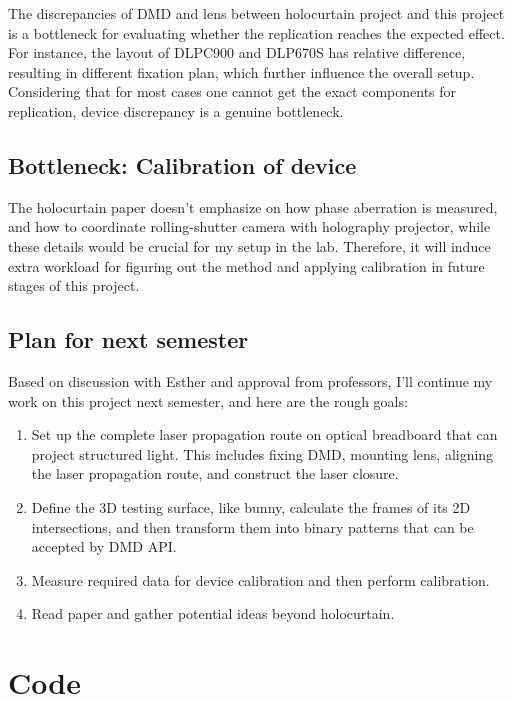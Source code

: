 \documentclass[10pt,journal,compsoc]{IEEEtran}
\begin{document}
The discrepancies of DMD and lens between holocurtain project and this project is a bottleneck for evaluating whether the replication reaches the expected effect. For instance, the layout of DLPC900 and DLP670S has relative difference, resulting in different fixation plan, which further influence the overall setup. Considering that for most cases one cannot get the exact components for replication, device discrepancy is a genuine bottleneck.

\subsection{Bottleneck: Calibration of device}
The holocurtain paper\cite{holocurtain} doesn't emphasize on how phase aberration is measured, and how to coordinate rolling-shutter camera with holography projector, while these details would be crucial for my setup in the lab. Therefore, it will induce extra workload for figuring out the method and applying calibration in future stages of this project.

\subsection{Plan for next semester}

Based on discussion with Esther and approval from professors, I'll continue my work on this project next semester, and here are the rough goals:
\begin{enumerate}
    \item Set up the complete laser propagation route on optical breadboard that can project structured light. This includes fixing DMD, mounting lens, aligning the laser propagation route, and construct the laser closure.
    \item Define the 3D testing surface, like bunny, calculate the frames of its 2D intersections, and then transform them into binary patterns that can be accepted by DMD API.
    \item Measure required data for device calibration and then perform calibration.
    \item Read paper and gather potential ideas beyond holocurtain.
\end{enumerate}

\section*{Code}
\label{sec:Code}
\end{document}
